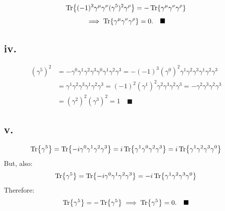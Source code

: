 \documentclass{article}
\begin{document}
$$\Tr{(-1)^3\gamma^\mu\gamma^\nu(\gamma^5)^2\gamma^\rho}=-\Tr{\gamma^\mu\gamma^\nu\gamma^\rho}
$$
$$
\implies \Tr{\gamma^\mu\gamma^\nu\gamma^\rho}=0.\quad \blacksquare
$$
\subsection*{iv.}
\begin{equation}
    \begin{split}
        (\gamma^5)^2&=-\gamma^0\gamma^1\gamma^2\gamma^3\gamma^0\gamma^1\gamma^2\gamma^3=-(-1)^3(\gamma^0)^2\gamma^1\gamma^2\gamma^3\gamma^1\gamma^2\gamma^3 \\ 
        &= \gamma^1\gamma^2\gamma^3\gamma^1\gamma^2\gamma^3=(-1)^2(\gamma^1)^2\gamma^2\gamma^3\gamma^2\gamma^3=- \gamma^2\gamma^3\gamma^2\gamma^3\\
        &= (\gamma^2)^2(\gamma^3)^2 = 1 \quad \blacksquare
    \end{split}
\end{equation}

\subsection*{v.}
\begin{equation}
    \begin{split}
        \Tr{\gamma^5} = \Tr{-i\gamma^0\gamma^1\gamma^2\gamma^3}=i\Tr{\gamma^1\gamma^0\gamma^2\gamma^3}=i\Tr{\gamma^1\gamma^2\gamma^3\gamma^0}
    \end{split}
\end{equation}
But, also:
\begin{equation}
    \begin{split}
        \Tr{\gamma^5} = \Tr{-i\gamma^0\gamma^1\gamma^2\gamma^3}=-i\Tr{\gamma^1\gamma^2\gamma^3\gamma^0}
    \end{split}
\end{equation}
Therefore:
\begin{equation}
    \begin{split}
        \Tr{\gamma^5} = -\Tr{\gamma^5} \implies \Tr{\gamma^5} = 0. \quad \blacksquare 
    \end{split}
\end{equation}
\end{document}
